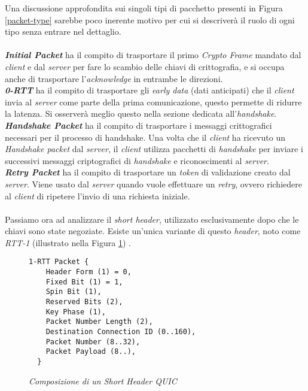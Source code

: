 \noindent Una discussione approfondita sui singoli tipi di pacchetto presenti in Figura \ref{packet-type} sarebbe poco inerente motivo per cui si descriverà il ruolo di ogni tipo senza entrare nel dettaglio. 
\\\\
\indent \textbf{\emph{Initial Packet}} ha il compito di trasportare il primo \emph{Crypto Frame} mandato dal \emph{client} e dal \emph{server} per fare lo scambio delle chiavi di crittografia, e si occupa anche di trasportare l'\emph{acknowledge} in entrambe le direzioni.
\\
\indent \textbf{\emph{0-RTT}}  ha il compito di trasportare gli \emph{early data} (dati anticipati) che il \emph{client} invia al \emph{server} come parte della prima comunicazione, questo permette di ridurre la latenza. Si osserverà meglio questo nella sezione dedicata all'\emph{handshake}.
\\
\indent \textbf{\emph{Handshake Packet}}  ha il compito di trasportare i messaggi crittografici necessari per il processo di handshake. Una volta che il \emph{client} ha ricevuto un \emph{Handshake packet} dal \emph{server}, il \emph{client} utilizza pacchetti di \emph{handshake} per inviare i successivi messaggi criptografici di \emph{handshake} e riconoscimenti al \emph{server}.
\\
\indent \textbf{\emph{Retry Packet}}  ha il compito di trasportare un \emph{token} di validazione creato dal \emph{server}. Viene usato dal \emph{server} quando vuole effettuare un \emph{retry}, ovvero richiedere al \emph{client} di ripetere l'invio di una richiesta iniziale.
\\\\
Passiamo ora ad analizzare il \emph{short header}, utilizzato esclusivamente dopo che le chiavi sono state negoziate. Esiste un'unica variante di questo \emph{header}, noto come \emph{RTT-1} (illustrato nella Figura \ref{short-header}) \cite{site:rfc9000}.
\begin{figure}[!h]
    \centering
    \begin{small}
    \begin{BVerbatim}
1-RTT Packet {
    Header Form (1) = 0,
    Fixed Bit (1) = 1,
    Spin Bit (1),
    Reserved Bits (2),
    Key Phase (1),
    Packet Number Length (2),
    Destination Connection ID (0..160),
    Packet Number (8..32),
    Packet Payload (8..),
  }
    \end{BVerbatim}
\end{small}
    \caption{\emph{Composizione di un Short Header QUIC}}
    \label{short-header}
\end{figure}
